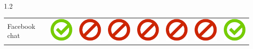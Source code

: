 \documentclass[final]{beamer}
\newlength{\twocolwid}
\begin{document}
\begin{frame}[t]
\begin{columns}[t, totalwidth=\textwidth]
\begin{column}{1.2\twocolwid}
\begin{tabular}{ L{8cm} | C{4.5cm} | C{4.5cm} | C{4.5cm} | C{4.5cm} | C{4.5cm} | C{5cm} | C{4.5cm} | }
Facebook chat & \includegraphics[scale=0.5]{pics/haken.png} & \includegraphics[scale=0.5]{pics/nohaken.png} & \includegraphics[scale=0.5]{pics/nohaken.png} & \includegraphics[scale=0.5]{pics/nohaken.png} & \includegraphics[scale=0.5]{pics/nohaken.png} & \includegraphics[scale=0.5]{pics/nohaken.png} & \includegraphics[scale=0.5]{pics/haken.png} \tabularnewline

\end{tabular}
\end{column}
\end{columns}
\end{frame}
\end{document}
